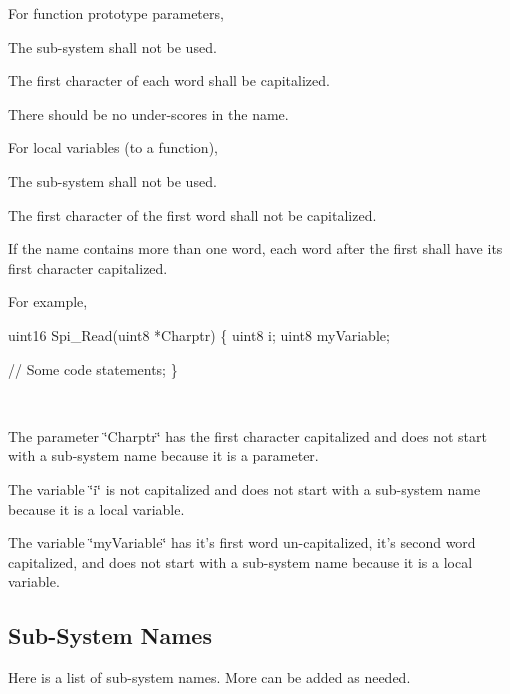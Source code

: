 For function prototype parameters,
\begin{DoxyItemize}
\item The sub-\/system shall not be used.
\item The first character of each word shall be capitalized.
\item There should be no under-\/scores in the name.
\end{DoxyItemize}

For local variables (to a function),
\begin{DoxyItemize}
\item The sub-\/system shall not be used.
\item The first character of the first word shall not be capitalized.
\item If the name contains more than one word, each word after the first shall have its first character capitalized.
\end{DoxyItemize}

For example,~\newline
~\newline



\begin{DoxyCode}
uint16 Spi\_Read(uint8 *Charptr) 
\{
  uint8 i;
  uint8 myVariable;
  
  \textcolor{comment}{// Some code}
  statements;
\}
\end{DoxyCode}
~\newline



\begin{DoxyItemize}
\item The parameter \char`\"{}\+Charptr\char`\"{} has the first character capitalized and does not start with a sub-\/system name because it is a parameter.
\item The variable \char`\"{}i\char`\"{} is not capitalized and does not start with a sub-\/system name because it is a local variable.
\item The variable \char`\"{}my\+Variable\char`\"{} has it's first word un-\/capitalized, it's second word capitalized, and does not start with a sub-\/system name because it is a local variable.
\end{DoxyItemize}\hypertarget{index_SSN}{}\subsection{Sub-\/\+System Names}\label{index_SSN}
Here is a list of sub-\/system names. More can be added as needed. ~\newline



